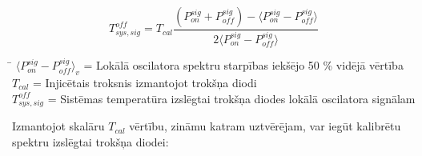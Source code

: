 \begin{equation}
T_{sys,sig}^{off} = T_{cal} \frac{ \left( P_{on}^{sig} + P_{off}^{sig} \right)  -  \langle P_{on}^{sig} - P_{off}^{sig} \rangle }{2 \langle  P_{on}^{sig} - P_{off}^{sig} \rangle} \tag{1.2.3}\label{eq:1.2.3} 
\end{equation}
\begin{tabbing}
\phantom{\hspace{30mm}}\= \kill
$\langle P_{on}^{sig} - P_{off}^{sig} \rangle_v$\> = Lokālā oscilatora spektru starpības iekšējo 50 \% vidējā vērtība\\
$T_{cal}$\>   = Injicētais troksnis izmantojot trokšņa diodi\\
$T_{sys,sig}^{off}$\>  = Sistēmas temperatūra izslēgtai trokšņa diodes lokālā oscilatora signālam\\
\end{tabbing}








Izmantojot skalāru $T_{cal}$ vērtību, zināmu katram uztvērējam, var iegūt kalibrētu spektru izslēgtai trokšņa diodei:

